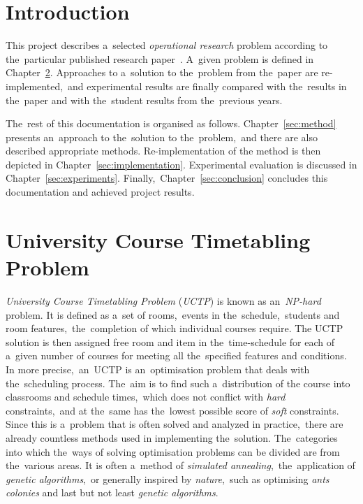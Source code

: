 \section{Introduction}
This project describes a~selected \textit{operational research} problem according to the~particular published research paper~\cite{paper}.
A~given problem is defined in Chapter~\ref{sec:problem}.
Approaches to a~solution to the~problem from the~paper are re-implemented,~and experimental results are finally compared with the~results in the~paper and with the~student results from the~previous years.

The~rest of this documentation is organised as follows.
Chapter~\ref{sec:method} presents an~approach to the~solution to the~problem,~and there are also described appropriate methods.
Re-implementation of the method is then depicted in Chapter~\ref{sec:implementation}.
Experimental evaluation is discussed in Chapter~\ref{sec:experiments}.
Finally,~Chapter~\ref{sec:conclusion} concludes this documentation and achieved project results.

\section{University Course Timetabling Problem} \label{sec:problem}
\textit{University Course Timetabling Problem} (\textit{UCTP}) is known as an~\emph{NP-hard} problem.
It is defined as a~set of rooms,~events in the~schedule,~students and room features,~the~completion of which individual courses require.
The UCTP solution is then assigned free room and item in the~time-schedule for each of a~given number of courses for meeting all the~specified features and conditions.
In more precise,~an~UCTP is an~optimisation problem that deals with the~scheduling process. 
The~aim is to find such a~distribution of the course into classrooms and schedule times,~which does not conflict with \textit{hard} constraints,~and at the~same has the~lowest possible score of \textit{soft} constraints.
Since this is a~problem that is often solved and analyzed in practice,~there are already countless methods used in implementing the~solution.
The~categories into which the~ways of solving optimisation problems can be divided are from the~various areas.
It is often a~method of \textit{simulated annealing},~the~application of \textit{genetic algorithms},~or generally inspired by \textit{nature},~such as optimising \textit{ants colonies} and last but not least \textit{genetic algorithms}.

